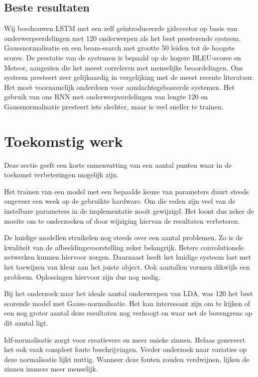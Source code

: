 \subsection{Beste resultaten}
Wij beschouwen LSTM met een zelf ge\"introduceerde gidsvector op basis van onderwerpverdelingen met 120 onderwerpen als het best presterende systeem. Gaussnormalisatie en een beam-search met grootte 50 leiden tot de hoogste scores.  De prestatie van de systemen is bepaald op de hogere BLEU-scores en Meteor, aangezien die het meest correleren met menselijke beoordelingen. Ons systeem presteert zeer gelijkaardig in vergelijking met de meest recente literatuur. Het moet voornamelijk onderdoen voor aandachtsgebaseerde systemen. Het gebruik van ons RNN met onderwerpverdelingen van lengte 120 en Gaussnormalisatie presteert iets slechter, maar is veel sneller te trainen.

\section{Toekomstig werk}
Deze sectie geeft een korte samenvatting van een aantal punten waar in de toekomst verbeteringen mogelijk zijn.

Het trainen van een model met een bepaalde keuze van parameters duurt steeds ongeveer een week op de gebruikte hardware. Om die reden zijn veel van de instelbare parameters in de implementatie nooit gewijzigd. Het loont dus zeker de moeite om te onderzoeken of door wijziging hiervan de resultaten verbeteren.

De huidige modellen struikelen nog steeds over een aantal problemen. Zo is de kwaliteit van de afbeeldingsvoorstelling zeker belangrijk. Betere convolutionele netwerken kunnen hiervoor zorgen. Daarnaast heeft het huidige systeem last met het toewijzen van kleur aan het juiste object. Ook aantallen vormen dikwijls een probleem. Oplossingen hiervoor zijn dus nog nodig.

Bij het onderzoek naar het ideale aantal onderwerpen van LDA, was 120 het best scorende model met Gauss-normalisatie. Het kan interessant zijn om te kijken of een nog groter aantal deze resultaten nog verhoogt en waar net de bovengrens op dit aantal ligt.

Idf-normalisatie zorgt voor creatievere en meer unieke zinnen. Helaas genereert het ook vaak compleet foute beschrijvingen. 
Verder onderzoek naar variaties op deze normalisatie lijkt nuttig. Wanneer deze fouten zouden verdwijnen, lijken de zinnen immers meer menselijk.

